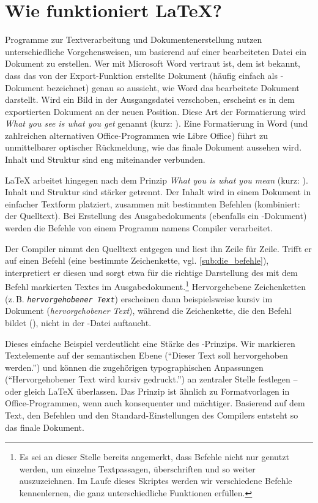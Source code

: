\section{Wie funktioniert \LaTeX?}
\label{sec:wie_funktioniert_latex_}

Programme zur Textverarbeitung und Dokumentenerstellung nutzen unterschiedliche Vorgehensweisen, um basierend auf einer bearbeiteten Datei ein Dokument zu erstellen.
Wer mit Microsoft Word vertraut ist, dem ist bekannt, dass das von der Export-Funktion erstellte Dokument (häufig einfach als -Dokument bezeichnet) genau so aussieht, wie Word das bearbeitete Dokument darstellt.
Wird ein Bild in der Ausgangsdatei verschoben, erscheint es in dem exportierten Dokument an der neuen Position.
Diese Art der Formatierung wird \emph{What you see is what you get} genannt (kurz: ).
Eine Formatierung in Word (und zahlreichen alternativen Office-Programmen wie Libre Office) führt zu unmittelbarer optischer Rückmeldung, wie das finale Dokument aussehen wird. 
Inhalt und Struktur sind eng miteinander verbunden.

\LaTeX{} arbeitet hingegen nach dem Prinzip \emph{What you  is what you mean} (kurz: ). 
Inhalt und Struktur sind stärker getrennt.
Der Inhalt wird in einem Dokument in einfacher Textform platziert, zusammen mit bestimmten Befehlen (kombiniert: der Quelltext).
Bei Erstellung des Ausgabedokuments (ebenfalls ein -Dokument) werden die Befehle von einem Programm namens Compiler verarbeitet.

Der Compiler nimmt den Quelltext entgegen und liest ihn Zeile für Zeile.
Trifft er auf einen Befehl (eine bestimmte Zeichenkette, vgl. \cref{sub:die_befehle}), interpretiert er diesen und sorgt etwa für die richtige Darstellung des mit dem Befehl markierten Textes im Ausgabedokument.\footnote{Es sei an dieser Stelle bereits angemerkt, dass Befehle nicht nur genutzt werden, um einzelne Textpassagen, überschriften und so weiter auszuzeichnen. Im Laufe dieses Skriptes werden wir verschiedene Befehle kennenlernen, die ganz unterschiedliche Funktionen erfüllen.}
Hervorgehebene Zeichenketten (z.\,B. \texttt{\emph{hervorgehobener Text}}) erscheinen dann beispielsweise kursiv im Dokument (\emph{hervorgehobener Text}), während die Zeichenkette, die den Befehl bildet (\texttt{\emph{}}), nicht in der -Datei auftaucht.

Dieses einfache Beispiel verdeutlicht eine Stärke des -Prinzips. 
Wir markieren Textelemente auf der semantischen Ebene (\enquote{Dieser Text soll hervorgehoben werden.}) und können die zugehörigen typographischen Anpassungen (\enquote{Hervorgehobener Text wird kursiv gedruckt.}) an zentraler Stelle festlegen -- oder gleich \LaTeX{} überlassen.
Das Prinzip ist ähnlich zu Formatvorlagen in Office-Programmen, wenn auch konsequenter und mächtiger.
Basierend auf dem Text, den Befehlen und den Standard-Einstellungen des Compilers entsteht so das finale Dokument.

